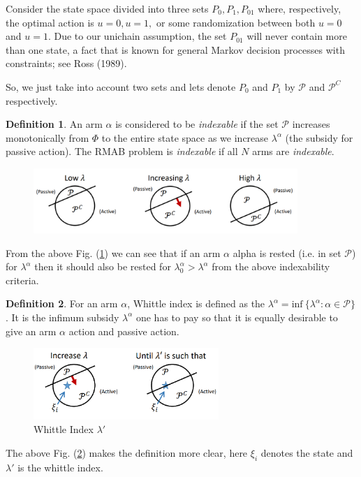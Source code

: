 \documentclass{article}
\theoremstyle{definition}
\newtheorem{definition}{Definition}[section]
\begin{document}
Consider the state space divided into three sets $P_0, P_1, P_{01}$ where, respectively, the optimal action is $u = 0, u = 1,$ or some randomization between both $u = 0$ and $u = 1$. Due to our unichain assumption, the set $P_{01}$ will never contain more than one state, a fact that is
known for general Markov decision processes with constraints; see Ross (1989).

So, we just take into account two sets and lets denote $P_0$ and $P_1$ by $\mathcal{P}$ and $\mathcal{P}^C$ respectively.

\begin{definition}
An arm $\alpha$ is considered to be \textit{indexable} if the set $\mathcal{P}$ increases monotonically from $\Phi$ to the entire state space as we increase $\lambda^\alpha$ (the subsidy for passive action). The RMAB problem is \textit{indexable} if all $N$ arms are \textit{indexable}.
\end{definition}

\begin{figure}[htp]
    \centering
    \includegraphics[width=10cm]{images/whittle1.png}
    \caption{}
    \label{fig:whittle1}
\end{figure}


From the above Fig. (\ref{fig:whittle1}) we can see that if an arm $\alpha$ alpha is rested (i.e. in set $\mathcal{P}$) for $\lambda^\alpha$ then it should also be rested for $\lambda_0^\alpha>\lambda^\alpha$ from the above indexability criteria.\\

\begin{definition}
For an arm $\alpha$, Whittle index is defined as the $\lambda^\alpha = \text{inf}\ \{\lambda^\alpha: \alpha \in \mathcal{P}\}$. It is the infimum subsidy $\lambda^\alpha$ one has to pay so that it is equally desirable to give an arm $\alpha$ action and passive action.
\end{definition}
\begin{figure}[htp]
    \centering
    \includegraphics[width=7cm]{images/whittle2.png}
    \caption{Whittle Index $\lambda'$}
    \label{fig:whittle2}
\end{figure}
The above Fig. (\ref{fig:whittle2}) makes the definition more clear, here $\xi_i$ denotes the state and $\lambda'$ is the whittle index.\\
\end{document}
